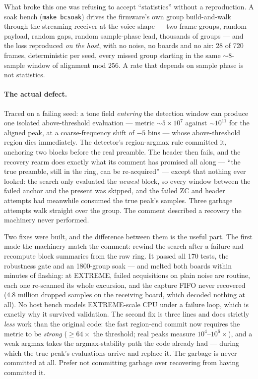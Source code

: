 What broke this one was refusing to accept ``statistics'' without a
reproduction.  A soak bench (\texttt{make bcsoak}) drives the
firmware's own group build-and-walk through the streaming receiver at
the voice shape --- two-frame groups, random payload, random gaps,
random sample-phase lead, thousands of groups --- and the loss
reproduced \emph{on the host}, with no noise, no boards and no air:
28 of 720 frames, deterministic per seed, every missed group starting
in the same $\sim$8-sample window of alignment mod 256.  A rate that
depends on sample phase is not statistics.

\paragraph{The actual defect.}
Traced on a failing seed: a tone field \emph{entering} the detection
window can produce one isolated above-threshold evaluation --- metric
$\sim$$5\times10^{7}$ against $\sim$$10^{11}$ for the aligned peak, at
a coarse-frequency shift of $-5$ bins --- whose above-threshold region
dies immediately.  The detector's region-argmax rule committed it,
anchoring two blocks before the real preamble.  The header then fails,
and the recovery rearm does exactly what its comment has promised all
along --- ``the true preamble, still in the ring, can be re-acquired''
--- except that nothing ever looked: the search only evaluated the
\emph{newest} block, so every window between the failed anchor and the
present was skipped, and the failed ZC and header attempts had
meanwhile consumed the true peak's samples.  Three garbage attempts
walk straight over the group.  The comment described a recovery the
machinery never performed.

Two fixes were built, and the difference between them is the useful
part.  The first made the machinery match the comment: rewind the
search after a failure and recompute block summaries from the raw
ring.  It passed all 170 tests, the robustness gate and an 1800-group
soak --- and melted both boards within minutes of flashing:
at EXTREME, failed acquisitions on plain noise are routine, each one
re-scanned its whole excursion, and the capture FIFO never recovered
(4.8 million dropped samples on the receiving board, which decoded
nothing at all).  No host bench models EXTREME-scale CPU under a
failure loop, which is exactly why it survived validation.  The second
fix is three lines and does strictly \emph{less} work than the
original code: the fast region-end commit now requires the metric to
be \emph{strong} ($\geq 64\times$ the threshold; real peaks measure
$10^{4}$--$10^{6}\times$), and a weak argmax takes the
argmax-stability path the code already had --- during which the true
peak's evaluations arrive and replace it.  The garbage is never
committed at all.  Prefer not committing garbage over recovering from
having committed it.

